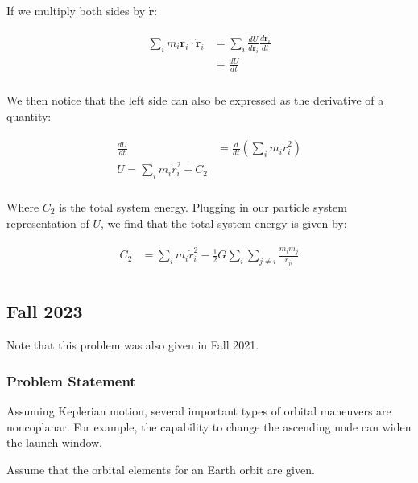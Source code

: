 \documentclass[
]{article}
\begin{document}
If we multiply both sides by \(\dot{\mathbf{r}}\):

\[\begin{aligned}
\begin{aligned}
    \sum_i m_i \dot{\mathbf{r}}_i \cdot \ddot{\mathbf{r}}_i &= \sum_i\frac{d U}{d \mathbf{r}_i} \frac{d \mathbf{r}_i}{dt} \\
    &= \frac{d U}{dt} \\
\end{aligned}
\end{aligned}\]

We then notice that the left side can also be expressed as the
derivative of a quantity:

\[\begin{aligned}
\begin{aligned}
    \frac{dU}{dt} &= \frac{d}{dt} \left( \sum_i m_i \dot{r}_i^2 \right) \\
    U = \sum_i m_i \dot{r}_i^2 + C_2 \\
\end{aligned}
\end{aligned}\]

Where \(C_2\) is the total system energy. Plugging in our particle
system representation of \(U\), we find that the total system energy is
given by:

\[\begin{aligned}
\begin{aligned}
    C_2 &= \sum_i m_i \dot{r}_i^2 - \frac{1}{2} G \sum_i \sum_{j \neq i} \frac{m_i m_j}{r_{ji}} \\
\end{aligned}
\end{aligned}\]

\subsection{Fall 2023}\label{fall-2023}

Note that this problem was also given in Fall 2021.

\subsubsection{Problem Statement}\label{problem-statement-1}

Assuming Keplerian motion, several important types of orbital maneuvers
are noncoplanar. For example, the capability to change the ascending
node can widen the launch window.

Assume that the orbital elements for an Earth orbit are given.
\end{document}
